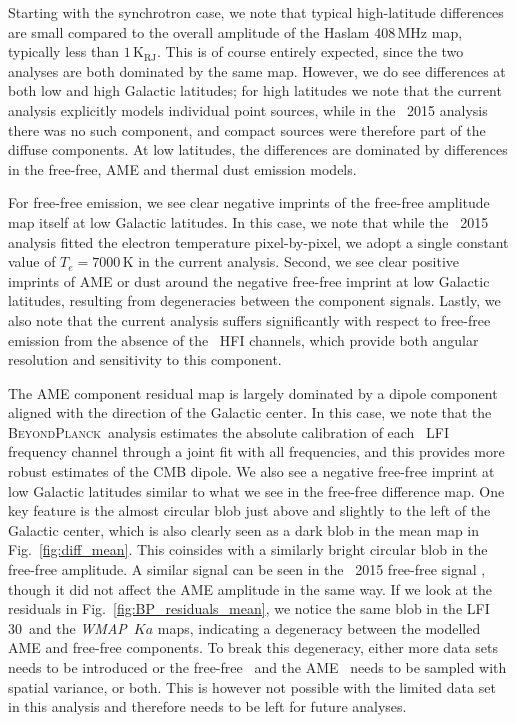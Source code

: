 \documentclass[twocolumn]{aa}
\def\WMAP{\emph{WMAP}}
\newcommand{\BP}{\textsc{BeyondPlanck}}
\begin{document}
Starting with the synchrotron case, we note that typical high-latitude
differences are small compared to the overall amplitude of the Haslam
408\,MHz map, typically less than $1\,\mathrm{K}_{\mathrm{RJ}}$. This
is of course entirely expected, since the two analyses are both
dominated by the same map. However, we do see differences at both low
and high Galactic latitudes; for high latitudes we note that the
current analysis explicitly models individual point sources, while in
the \Planck\ 2015 analysis there was no such component, and compact
sources were therefore part of the diffuse components. At low
latitudes, the differences are dominated by differences in the
free-free, AME and thermal dust emission models.

For free-free emission, we see clear negative imprints of the free-free
amplitude map itself at low Galactic latitudes. In this case, we note
that while the \Planck\ 2015 analysis fitted the electron temperature
pixel-by-pixel, we adopt a single constant value of $T_e =
7000\,\mathrm{K}$ in the current analysis. Second, we see clear positive
imprints of AME or dust around the negative free-free imprint at low
Galactic latitudes, resulting from degeneracies between the component
signals. Lastly, we also note that
the current analysis suffers significantly with respect to free-free
emission from the absence of the \Planck\ HFI channels, which
provide both angular resolution and sensitivity to this component.

The AME component residual map is largely dominated by a dipole
component aligned with the direction of the Galactic center. In this
case, we note that the \BP\ analysis estimates the absolute
calibration of each \Planck\ LFI frequency channel through a joint fit
with all frequencies, and this provides more robust estimates of the
CMB dipole. We also see a negative free-free imprint at low Galactic
latitudes similar to what we see in the free-free difference map.
One key feature is the almost circular blob just above and slightly to
the left of the Galactic center, which is also clearly seen as a dark
blob in the mean map in Fig.~\ref{fig:diff_mean}. This coinsides with
a similarly bright circular blob in the free-free amplitude. A similar
signal can be seen in the \Planck\ 2015 free-free signal \citep{planck2014-a12},
though it did not affect the AME amplitude in the same way.
If we look at the residuals in Fig.~\ref{fig:BP_residuals_mean}, we
notice the same blob in the LFI 30\GHz\ and the \WMAP\ $Ka$ maps,
indicating a degeneracy between the modelled AME and free-free components.
To break this degeneracy, either more data sets needs to be introduced or
the free-free \Te\ and the AME \nup\ needs to be sampled with spatial
variance, or both. This is however not possible with the limited data set
in this analysis and therefore needs to be left for future analyses.
\end{document}
